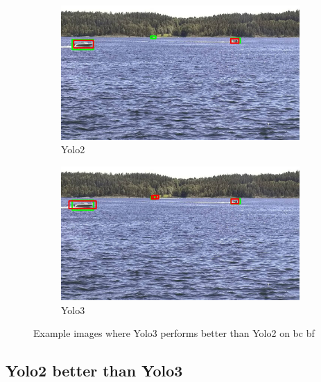 \begin{figure}[h!]
\begin{subfigure}{.5\textwidth}
  \centering
  \includegraphics[width=0.9\linewidth]{results/case_buildings/yolo23/3better/yolo2/selected_06_25_frame0264.jpg}
  \caption{Yolo2}
\end{subfigure}%
\begin{subfigure}{.5\textwidth}
  \centering
  \includegraphics[width=.9\linewidth]{results/case_buildings/yolo23/3better/yolo3/selected_06_25_frame0264.jpg}
  \caption{Yolo3}
\end{subfigure}
\caption{Example images where Yolo3 performs better than Yolo2 on bc bf}
\label{img:yolo3_better}

\end{figure}

\newpage

\subsection{Yolo2 better than Yolo3}
\label{sec:2better}

